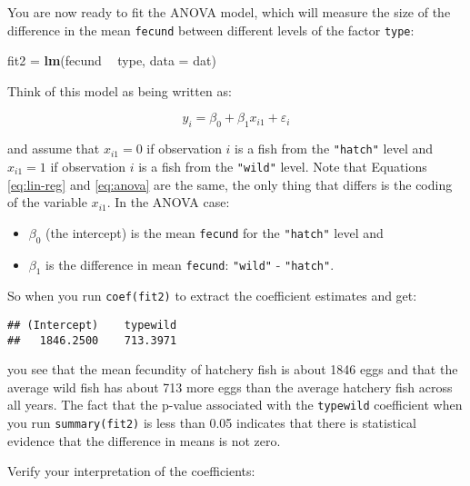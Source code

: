 \documentclass[]{book}
\newenvironment{Shaded}{\begin{snugshade}}{\end{snugshade}}
\newcommand{\KeywordTok}[1]{\textcolor[rgb]{0.13,0.29,0.53}{\textbf{#1}}}
\newcommand{\DataTypeTok}[1]{\textcolor[rgb]{0.13,0.29,0.53}{#1}}
\newcommand{\StringTok}[1]{\textcolor[rgb]{0.31,0.60,0.02}{#1}}
\newcommand{\OperatorTok}[1]{\textcolor[rgb]{0.81,0.36,0.00}{\textbf{#1}}}
\newcommand{\NormalTok}[1]{#1}
\providecommand{\tightlist}{%
  \setlength{\itemsep}{0pt}\setlength{\parskip}{0pt}}
\theoremstyle{definition}
\theoremstyle{definition}
\theoremstyle{definition}
\theoremstyle{remark}
\begin{document}
You are now ready to fit the ANOVA model, which will measure the size of
the difference in the mean \texttt{fecund} between different levels of
the factor \texttt{type}:

\begin{Shaded}
\begin{Highlighting}[]
\NormalTok{fit2 =}\StringTok{ }\KeywordTok{lm}\NormalTok{(fecund }\OperatorTok{~}\StringTok{ }\NormalTok{type, }\DataTypeTok{data =}\NormalTok{ dat)}
\end{Highlighting}
\end{Shaded}

Think of this model as being written as:

\begin{equation}
  y_i=\beta_0 + \beta_1 x_{i1} + \varepsilon_i
\label{eq:anova}
\end{equation}

and assume that \(x_{i1} = 0\) if observation \(i\) is a fish from the
\texttt{"hatch"} level and \(x_{i1} = 1\) if observation \(i\) is a fish
from the \texttt{"wild"} level. Note that Equations \eqref{eq:lin-reg} and
\eqref{eq:anova} are the same, the only thing that differs is the coding
of the variable \(x_{i1}\). In the ANOVA case:

\begin{itemize}
\tightlist
\item
  \(\beta_0\) (the intercept) is the mean \texttt{fecund} for the
  \texttt{"hatch"} level and
\item
  \(\beta_1\) is the difference in mean \texttt{fecund}: \texttt{"wild"}
  - \texttt{"hatch"}.
\end{itemize}

So when you run \texttt{coef(fit2)} to extract the coefficient estimates
and get:

\begin{verbatim}
## (Intercept)    typewild 
##   1846.2500    713.3971
\end{verbatim}

you see that the mean fecundity of hatchery fish is about 1846 eggs and
that the average wild fish has about 713 more eggs than the average
hatchery fish across all years. The fact that the p-value associated
with the \texttt{typewild} coefficient when you run
\texttt{summary(fit2)} is less than 0.05 indicates that there is
statistical evidence that the difference in means is not zero.

Verify your interpretation of the coefficients:
\end{document}

